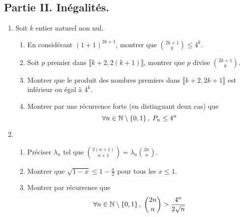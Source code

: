 \subsection*{Partie II. Inégalités.}
 \begin{enumerate}
     \item Soit $k$ entier naturel non nul.
\begin{enumerate}
  \item En considérant $(1+1)^{2k+1}$, montrer que $\binom{2k+1}{k}\leq 4^k$.
  \item Soit $p$ premier dans $\llbracket k+2, 2(k+1)\rrbracket$, montrer que $p$ divise $\binom{2k+1}{k}$.
  \item Montrer que le produit des nombres premiers dans $\llbracket k+2, 2k+1\rrbracket$ est inférieur ou égal à $4^k$.
  \item Montrer par une récurrence forte (en distinguant deux cas) que 
\begin{displaymath}
\forall n \in \mathbb{N}\setminus\left\lbrace 0,1\right\rbrace, \;   P_n \leq 4^n
\end{displaymath}
\end{enumerate}
     \item 
\begin{enumerate}
  \item Préciser $\lambda_n$ tel que $\binom{2(n+1)}{n+1} = \lambda_n \binom{2n}{n}$.
  \item Montrer que $\sqrt{1-x} \leq 1-\frac{x}{2}$ pour tous les $x\leq 1$.
  \item Montrer par récurrence que
\begin{displaymath}
  \forall n \in \mathbb{N}\setminus\left\lbrace 0,1\right\rbrace, \; 
  \binom{2n}{n} > \frac{4^n}{2\sqrt{n}}
\end{displaymath}
\end{enumerate}

 \end{enumerate}
 
 
